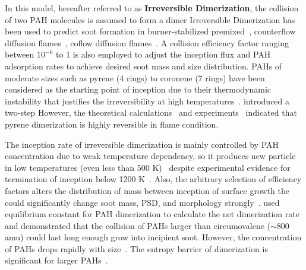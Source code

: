 In this model, hereafter referred to as \textbf{Irreversible Dimerization}, the collision of two PAH molecules is assumed to form a dimer
Irreversible Dimerization has been used to predict soot formation in burner-stabilized premixed~\citep{salenbauch2015modeling, desgroux2017comparative}, counterflow diffusion flames~\citep{wang2015soot, xu2021experimental}, coflow diffusion flames~\citep{kholghy2016core, veshkini2016understanding}. A collision efficiency factor ranging between $10^{-6}$ to 1 is also employed to adjust the inception flux and PAH adsorption rates to achieve desired soot mass and size distribution. PAHs of moderate sizes such as pyrene (4 rings) to coronene (7 rings) have been considered as the starting point of inception due to their thermodynamic instability that justifies the irreversibility at high temperatures~\citep{frenklach1991detailed}. \citet{blanquart2009analyzing} introduced a two-step However, the theoretical calculations~\citep{miller1985calculations} and experiments~\citep{sabbah2010exploring} indicated that pyrene dimerization is highly reversible in flame condition. 

The inception rate of irreversible dimerization is mainly controlled by PAH concentration due to weak temperature dependency, so it produces new particle in low temperatures (even less than 500 K)~\citep{naseri2022simulating} despite experimental evidence for termination of inception below 1200 K~\citep{sanchez2012polycyclic, cho2016synthesis}. Also, the arbitrary selection of efficiency factors alters the distribution of mass between inception of surface growth the could significantly change soot mass, PSD, and morphology strongly~\citep{saffaripour2014experimental}. \citet{miller1991kinetics} used equilibrium constant for PAH dimerization to calculate the net dimerization rate and demonstrated that the collision of PAHs larger than circumovalene ($\sim$800 amu) could last long enough grow into incipient soot. However, the concentration of PAHs drops rapidly with size~\citep{Wang2011}. The entropy barrier of dimerization is significant for larger PAHs~\citep{giordana2011theoretical}.  



